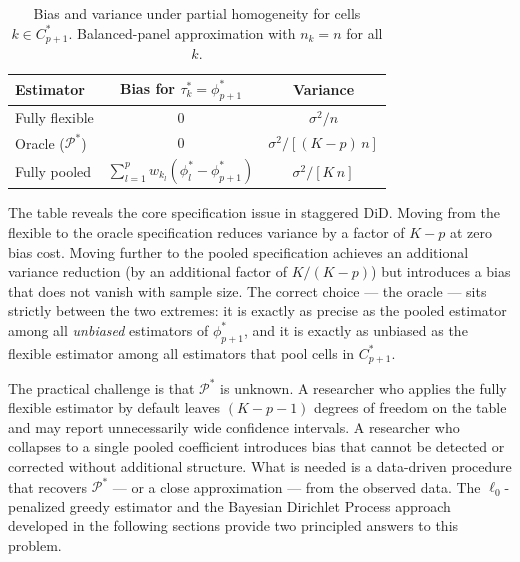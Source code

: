 \documentclass[12pt]{article}
\newcommand{\1}{\mathbbm{1}}
\begin{document}
\begin{table}[ht]
  \centering
  \caption{Bias and variance under partial homogeneity for cells $k \in C_{p+1}^*$.
    Balanced-panel approximation with $n_k = n$ for all $k$.}
  \label{tab:spec_tradeoff}
  \begin{tabular}{lcc}
    \toprule
    Estimator & Bias for $\tau_k^* = \phi_{p+1}^*$ & Variance \\
    \midrule
    Fully flexible  & $0$                              & $\sigma^2 / n$ \\[4pt]
    Oracle ($\mathcal{P}^*$) & $0$               & $\sigma^2 / [(K-p)\,n]$ \\[4pt]
    Fully pooled    & $\displaystyle\sum_{l=1}^p w_{k_l}(\phi_l^* - \phi_{p+1}^*)$ & $\sigma^2 / [K\,n]$ \\
    \bottomrule
  \end{tabular}
\end{table}

\noindent The table reveals the core specification issue in staggered DiD.
Moving from the flexible to the oracle specification reduces variance by a
factor of $K-p$ at zero bias cost.
Moving further to the pooled specification achieves an additional variance
reduction (by an additional factor of $K/(K-p)$) but introduces a bias that
does not vanish with sample size.
The correct choice --- the oracle --- sits strictly between the two
extremes: it is exactly as precise as the pooled estimator among all
\emph{unbiased} estimators of $\phi_{p+1}^*$, and it is exactly as unbiased
as the flexible estimator among all estimators that pool cells in $C_{p+1}^*$.

The practical challenge is that $\mathcal{P}^*$ is unknown.
A researcher who applies the fully flexible estimator by default leaves
$(K-p-1)$ degrees of freedom on the table and may report unnecessarily
wide confidence intervals.
A researcher who collapses to a single pooled coefficient introduces
bias that cannot be detected or corrected without additional structure.
What is needed is a data-driven procedure that recovers $\mathcal{P}^*$
--- or a close approximation --- from the observed data.
The $\ell_0$-penalized greedy estimator and the Bayesian Dirichlet Process
approach developed in the following sections provide two principled answers
to this problem.
\end{document}
